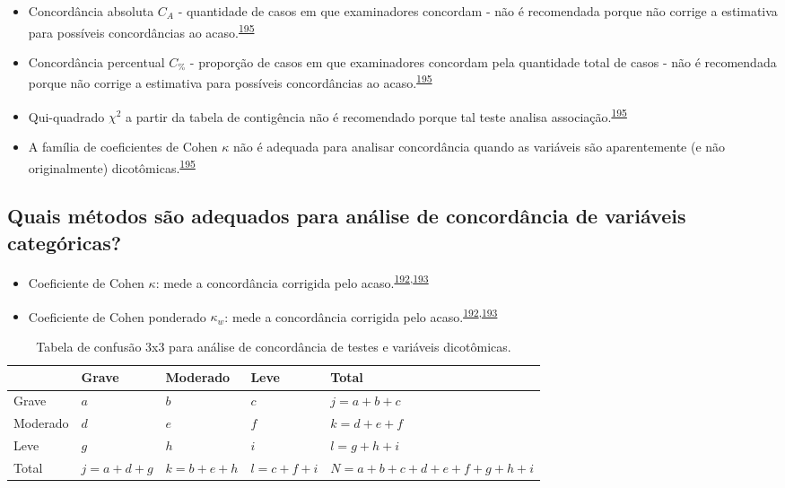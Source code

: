\documentclass[
  a4paper,
]{book}
\begin{document}
\begin{itemize}
\item
  Concordância absoluta \(C_{A}\) - quantidade de casos em que examinadores concordam - não é recomendada porque não corrige a estimativa para possíveis concordâncias ao acaso.\textsuperscript{\protect\hyperlink{ref-banerjee1999}{195}}
\item
  Concordância percentual \(C_{\%}\) - proporção de casos em que examinadores concordam pela quantidade total de casos - não é recomendada porque não corrige a estimativa para possíveis concordâncias ao acaso.\textsuperscript{\protect\hyperlink{ref-banerjee1999}{195}}
\item
  Qui-quadrado \(\chi^2\) a partir da tabela de contigência não é recomendado porque tal teste analisa associação.\textsuperscript{\protect\hyperlink{ref-banerjee1999}{195}}
\item
  A família de coeficientes de Cohen \(\kappa\) não é adequada para analisar concordância quando as variáveis são aparentemente (e não originalmente) dicotômicas.\textsuperscript{\protect\hyperlink{ref-banerjee1999}{195}}
\end{itemize}

\hypertarget{quais-muxe9todos-suxe3o-adequados-para-anuxe1lise-de-concorduxe2ncia-de-variuxe1veis-categuxf3ricas}{%
\subsection{Quais métodos são adequados para análise de concordância de variáveis categóricas?}\label{quais-muxe9todos-suxe3o-adequados-para-anuxe1lise-de-concorduxe2ncia-de-variuxe1veis-categuxf3ricas}}

\begin{itemize}
\item
  Coeficiente de Cohen \(\kappa\): mede a concordância corrigida pelo acaso.\textsuperscript{\protect\hyperlink{ref-scott1955}{192},\protect\hyperlink{ref-cohen1960}{193}}
\item
  Coeficiente de Cohen ponderado \(\kappa_{w}\): mede a concordância corrigida pelo acaso.\textsuperscript{\protect\hyperlink{ref-scott1955}{192},\protect\hyperlink{ref-cohen1960}{193}}
\end{itemize}

\begin{table}

\caption{\label{tab:crosstable-kappa-3x3}Tabela de confusão 3x3 para análise de concordância de testes e variáveis dicotômicas.}
\centering
\begin{tabu} to 
\toprule
\textbf{ } & \textbf{Grave} & \textbf{Moderado} & \textbf{Leve} & \textbf{Total}\\
\midrule
Grave & $a$ & $b$ & $c$ & $j=a+b+c$\\
Moderado & $d$ & $e$ & $f$ & $k=d+e+f$\\
Leve & $g$ & $h$ & $i$ & $l=g+h+i$\\
Total & $j=a+d+g$ & $k=b+e+h$ & $l=c+f+i$ & $N=a+b+c+d+e+f+g+h+i$\\
\bottomrule
\end{tabu}
\end{table}
\end{document}
